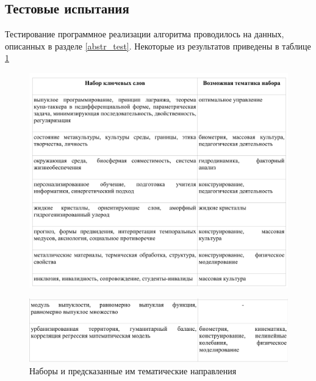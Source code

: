 \subsection{Тестовые испытания}
Тестирование программное реализации алгоритма проводилось на данных, описанных в разделе \ref{abstr_test}. Некоторые из результатов приведены в таблице \ref{tbl:theme_table_1}

\begin{figure}[ht]
  \begin{minipage}[ht]{1.0\linewidth}\centering
    \includegraphics[width=1.0\linewidth]{Dissertation/pics/theme_table_1}
  \end{minipage}
  \label{tbl:theme_table_1}
\end{figure}

\begin{figure}[ht]
  \begin{minipage}[ht]{1.0\linewidth}\centering
    \includegraphics[width=1.0\linewidth]{Dissertation/pics/theme_table_2}
    \caption{Наборы и предсказанные им тематические направления}
  \end{minipage}
  \label{tbl:theme_table_2}
\end{figure}

